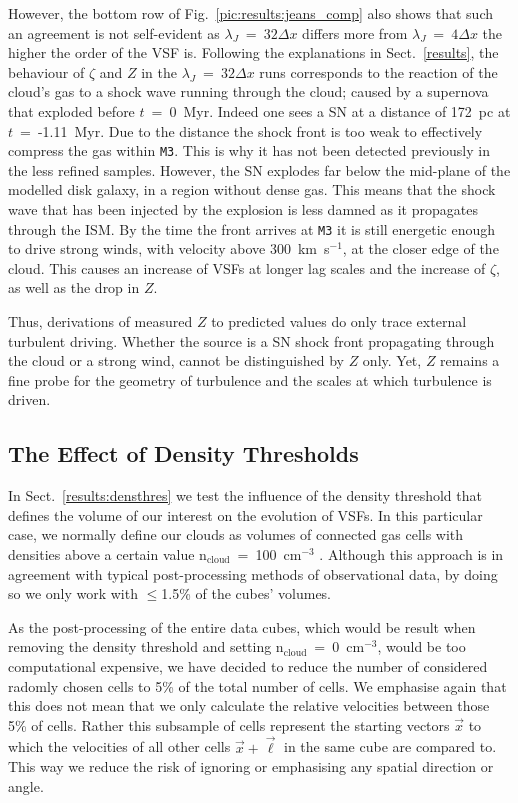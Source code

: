 However, the bottom row of Fig.~\ref{pic:results:jeans_comp} also shows that such an agreement is not self-evident as $\lambda_J$~=~$32\Delta{}x$ differs more from $\lambda_J$~=~$4\Delta{}x$ the higher the order of the VSF is.
Following the explanations in Sect.~\ref{results}, the behaviour of $\zeta$ and $Z$ in the $\lambda_J$~=~$32\Delta{}x$ runs corresponds to the reaction of the cloud's gas to a shock wave running through the cloud; caused by a supernova that exploded before $t$~=~0~Myr. 
Indeed one sees a SN at a distance of 172~pc at $t$~=~-1.11~Myr. 
Due to the distance the shock front is too weak to effectively compress the gas within \texttt{M3}.
This is why it has not been detected previously in the less refined samples.
However, the SN explodes far below the mid-plane of the modelled disk galaxy, in a region without dense gas.
This means that the shock wave that has been injected by the explosion is less damned as it propagates through the ISM. 
By the time the front arrives at \texttt{M3} it is still energetic enough to drive strong winds, with velocity above 300~km~s$^{-1}$, at the closer edge of the cloud. 
This causes an increase of VSFs at longer lag scales and the increase of $\zeta$, as well as the drop in $Z$.

Thus, derivations of measured $Z$ to predicted values do only trace external turbulent driving.
Whether the source is a SN shock front propagating through the cloud or a strong wind, cannot be distinguished by $Z$ only. 
Yet, $Z$ remains a fine probe for the geometry of turbulence and the scales at which turbulence is driven.


\subsection{The Effect of Density Thresholds}\label{discussion:densthres}

In Sect.~\ref{results:densthres} we test the influence of the density threshold that defines the volume of our interest on the evolution of VSFs.
In this particular case, we normally define our clouds as volumes of connected gas cells with densities above a certain value n$_\mathrm{cloud}$~=~100~cm$^{-3}$ . 
Although this approach is in agreement with typical post-processing methods of observational data, by doing so we only work with $\leq$1.5\% of the cubes' volumes.

As the post-processing of the entire data cubes, which would be result when removing the density threshold and setting n$_\mathrm{cloud}$~=~0~cm$^{-3}$, would be too computational expensive, we have decided to reduce the number of considered radomly chosen cells to 5\% of the total number of cells.
We emphasise again that this does not mean that we only calculate the relative velocities between those 5\% of cells.
Rather this subsample of cells represent the starting vectors $\vec{x}$ to which the velocities of all other cells  $\vec{x} + \vec{\ell}$ in the same cube are compared to.
This way we reduce the risk of ignoring or emphasising any spatial direction or angle.

